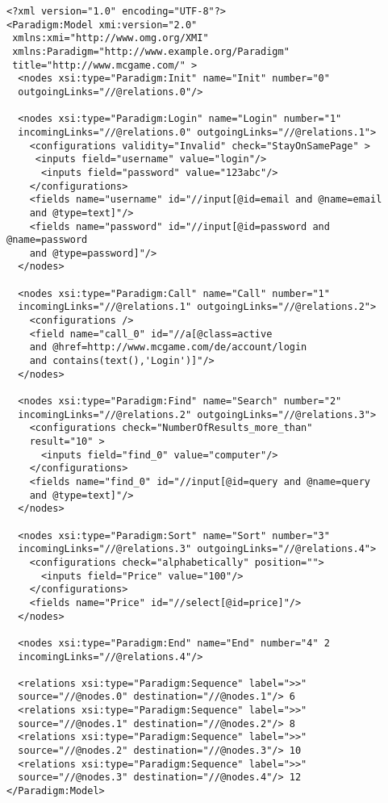 \begin{lstlisting}
<?xml version="1.0" encoding="UTF-8"?>
<Paradigm:Model xmi:version="2.0"
 xmlns:xmi="http://www.omg.org/XMI"
 xmlns:Paradigm="http://www.example.org/Paradigm"
 title="http://www.mcgame.com/" >
  <nodes xsi:type="Paradigm:Init" name="Init" number="0"
  outgoingLinks="//@relations.0"/>
  
  <nodes xsi:type="Paradigm:Login" name="Login" number="1"
  incomingLinks="//@relations.0" outgoingLinks="//@relations.1">
    <configurations validity="Invalid" check="StayOnSamePage" >
     <inputs field="username" value="login"/>
      <inputs field="password" value="123abc"/>
    </configurations>
    <fields name="username" id="//input[@id=email and @name=email
    and @type=text]"/>
    <fields name="password" id="//input[@id=password and @name=password
    and @type=password]"/>
  </nodes>

  <nodes xsi:type="Paradigm:Call" name="Call" number="1"
  incomingLinks="//@relations.1" outgoingLinks="//@relations.2">
    <configurations />
    <field name="call_0" id="//a[@class=active
    and @href=http://www.mcgame.com/de/account/login
    and contains(text(),'Login')]"/>
  </nodes>
  
  <nodes xsi:type="Paradigm:Find" name="Search" number="2"
  incomingLinks="//@relations.2" outgoingLinks="//@relations.3">
    <configurations check="NumberOfResults_more_than"
    result="10" >
      <inputs field="find_0" value="computer"/>
    </configurations>
    <fields name="find_0" id="//input[@id=query and @name=query
    and @type=text]"/>
  </nodes>

  <nodes xsi:type="Paradigm:Sort" name="Sort" number="3"
  incomingLinks="//@relations.3" outgoingLinks="//@relations.4">
    <configurations check="alphabetically" position="">
      <inputs field="Price" value="100"/>
    </configurations>
    <fields name="Price" id="//select[@id=price]"/>
  </nodes>

  <nodes xsi:type="Paradigm:End" name="End" number="4" 2
  incomingLinks="//@relations.4"/>

  <relations xsi:type="Paradigm:Sequence" label=">>"
  source="//@nodes.0" destination="//@nodes.1"/> 6
  <relations xsi:type="Paradigm:Sequence" label=">>"
  source="//@nodes.1" destination="//@nodes.2"/> 8
  <relations xsi:type="Paradigm:Sequence" label=">>"
  source="//@nodes.2" destination="//@nodes.3"/> 10
  <relations xsi:type="Paradigm:Sequence" label=">>"
  source="//@nodes.3" destination="//@nodes.4"/> 12
</Paradigm:Model>
\end{lstlisting}

